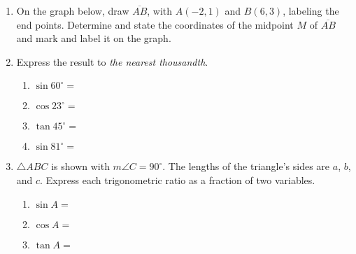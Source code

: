 \documentclass[12pt, twoside]{article}
\begin{document}
\begin{enumerate}
\newpage

    \item On the graph below, draw $\overline{AB}$, with $A(-2,1)$ and $B(6,3)$, labeling the end points. Determine and state the coordinates of the midpoint $M$ of $\overline{AB}$ and mark and label it on the graph.\\
\vspace{2cm}

      \item Express the result to \emph{the nearest thousandth}.  \vspace{0.5cm}
        \begin{multicols}{2}
          \begin{enumerate}
            \item $\sin 60^\circ = $ \vspace{0.5cm}
            \item $\cos 23^\circ =$
            \item $\tan 45^\circ = $ \vspace{0.5cm}
            \item $\sin 81^\circ =$
          \end{enumerate}
        \end{multicols}

      \item $\triangle ABC$ is shown with $m\angle C=90^\circ$. The lengths of the triangle's sides are $a$, $b$, and $c$. Express each trigonometric ratio as a fraction of two variables. \vspace{1cm}
      \begin{multicols}{2}

          \begin{enumerate}
          \item $\sin A =$ \vspace{0.75cm}
          \item $\cos A =$ \vspace{0.75cm}
          \item $\tan A =$
        \end{enumerate}
    \end{multicols}


\end{enumerate}
\end{document}
